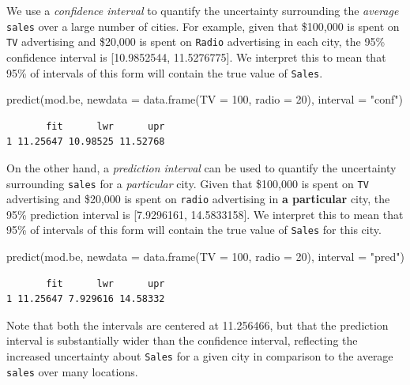 \documentclass[
]{article}
\newenvironment{Shaded}{\begin{snugshade}}{\end{snugshade}}
\newcommand{\AttributeTok}[1]{\textcolor[rgb]{0.77,0.63,0.00}{#1}}
\newcommand{\DecValTok}[1]{\textcolor[rgb]{0.00,0.00,0.81}{#1}}
\newcommand{\FunctionTok}[1]{\textcolor[rgb]{0.00,0.00,0.00}{#1}}
\newcommand{\NormalTok}[1]{#1}
\newcommand{\StringTok}[1]{\textcolor[rgb]{0.31,0.60,0.02}{#1}}
\begin{document}
We use a \emph{confidence interval} to quantify the uncertainty surrounding the \emph{average} \texttt{sales} over a large number of cities. For example, given that \$100,000 is spent on \texttt{TV} advertising and \$20,000 is spent on \texttt{Radio} advertising in each city, the 95\% confidence interval is {[}10.9852544, 11.5276775{]}. We interpret this to mean that 95\% of intervals of this form will contain the true value of \texttt{Sales}.

\begin{Shaded}
\begin{Highlighting}[]
\FunctionTok{predict}\NormalTok{(mod.be, }\AttributeTok{newdata =} \FunctionTok{data.frame}\NormalTok{(}\AttributeTok{TV =} \DecValTok{100}\NormalTok{, }\AttributeTok{radio =} \DecValTok{20}\NormalTok{), }\AttributeTok{interval =} \StringTok{"conf"}\NormalTok{)}
\end{Highlighting}
\end{Shaded}

\begin{verbatim}
       fit      lwr      upr
1 11.25647 10.98525 11.52768
\end{verbatim}

On the other hand, a \emph{prediction interval} can be used to quantify the uncertainty surrounding \texttt{sales} for a \emph{particular} city. Given that \$100,000 is spent on \texttt{TV} advertising and \$20,000 is spent on \texttt{radio} advertising in \textbf{a particular} city, the 95\% prediction interval is {[}7.9296161, 14.5833158{]}. We interpret this to mean that 95\% of intervals of this form will contain the true value of \texttt{Sales} for this city.

\begin{Shaded}
\begin{Highlighting}[]
\FunctionTok{predict}\NormalTok{(mod.be, }\AttributeTok{newdata =} \FunctionTok{data.frame}\NormalTok{(}\AttributeTok{TV =} \DecValTok{100}\NormalTok{, }\AttributeTok{radio =} \DecValTok{20}\NormalTok{), }\AttributeTok{interval =} \StringTok{"pred"}\NormalTok{)}
\end{Highlighting}
\end{Shaded}

\begin{verbatim}
       fit      lwr      upr
1 11.25647 7.929616 14.58332
\end{verbatim}

Note that both the intervals are centered at 11.256466, but that the prediction interval is substantially wider than the confidence interval, reflecting the increased uncertainty about \texttt{Sales} for a given city in comparison to the average \texttt{sales} over many locations.
\end{document}
